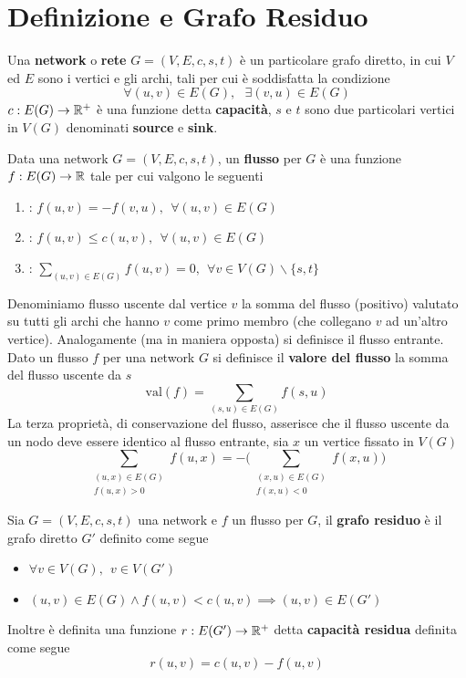 \documentclass[10pt, letterpaper]{report}
\begin{document}
\section{Definizione e Grafo Residuo}
\begin{definizione}
    Una \textbf{network} o \textbf{rete} $G=(V,E,c,s,t)$ è un particolare grafo diretto, in cui $V$ ed $E$ sono i vertici e gli archi, tali per cui è soddisfatta la condizione 
    $$\forall (u,v)\in E(G), \ \ \ \exists (v,u)\in E(G) $$
    $c:E(G)\rightarrow{\mathbb R}^+$ è una funzione detta \textbf{capacità}, $s$ e $t$ sono due particolari vertici in $V(G)$ denominati \textbf{source} e \textbf{sink}.
\end{definizione}
\begin{definizione}
    Data una network $G=(V,E,c,s,t)$, un \textbf{flusso} per $G$ è una funzione $f:E(G)\rightarrow{\mathbb R}$ tale per cui valgono le seguenti\begin{enumerate}
        \item {} : $f(u,v)=-f(v,u), \ \ \forall (u,v)\in E(G)$ 
        \item {} : $f(u,v)\le c(u,v), \ \ \forall (u,v)\in E(G)$ 
        \item {} : $\displaystyle\sum_{(u,v)\in E(G)}f(u,v)=0, \ \ \forall v\in V(G)\backslash\{s,t\}$ 
    \end{enumerate}
\end{definizione}
Denominiamo flusso uscente dal vertice $v$ la somma del flusso (positivo) valutato su tutti gli archi che hanno $v$ come primo membro (che collegano $v$ ad un'altro vertice). Analogamente (ma in maniera opposta) si definisce il flusso entrante.
Dato un flusso $f$ per una network $G$ si definisce il \textbf{valore del flusso} la somma del flusso uscente da $s$ 
$$ \text{val}(f)=\sum_{(s,u)\in E(G)}f(s,u)$$
La terza proprietà, di conservazione del flusso, asserisce che il flusso uscente da un nodo deve essere identico al flusso entrante, sia $x$ un vertice fissato in $V(G)$
$$ \sum_{\begin{matrix}(u,x)\in E(G)\\f(u,x)>0\end{matrix}}f(u,x)=-\Bigg(
\sum_{\begin{matrix}(x,u)\in E(G)\\f(x,u)<0\end{matrix}}f(x,u)\Bigg)$$
\begin{definizione}
    Sia $G=(V,E,c,s,t)$ una network e $f$ un flusso per $G$, il \textbf{grafo residuo} è il grafo diretto $G'$ definito come segue\begin{itemize}
        \item $\forall v\in V(G), \ \ v\in V(G')$
        \item $(u,v)\in E(G)\land f(u,v)<c(u,v)\implies (u,v)\in E(G')$
    \end{itemize}
    Inoltre è definita una funzione $r:E(G')\rightarrow {\mathbb R}^+$ detta \textbf{capacità residua} definita come segue $$ r(u,v)=c(u,v)-f(u,v)$$
\end{definizione}
\end{document}
